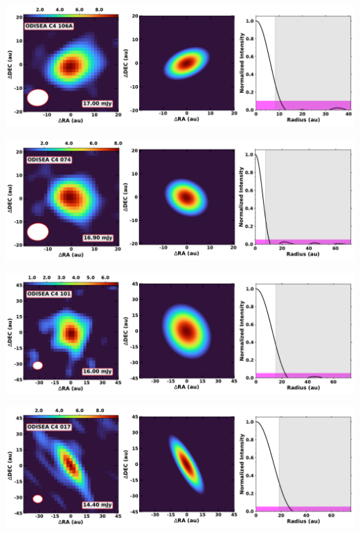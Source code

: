 \vspace{0pt}
\begin{minipage}{.49\textwidth}
	 \centering
	 	 \hrulesep
	 	 \includegraphics[width=1\linewidth]{pdf/0+II/018_odisea_c4_106a_cutout.pdf}
\end{minipage}%
\vrulesep
\begin{minipage}{.49\textwidth}
	 \centering
	 	 \hrulesep
	 	 \includegraphics[width=1\linewidth]{pdf/0+II/017_odisea_c4_074_cutout.pdf}
\end{minipage}%
\vspace{0pt}
\begin{minipage}{.49\textwidth}
	 \centering
	 	 \hrulesep
	 	 \includegraphics[width=1\linewidth]{pdf/0+II/016_odisea_c4_101_cutout.pdf}
\end{minipage}%
\vrulesep
\begin{minipage}{.49\textwidth}
	 \centering
	 	 \hrulesep
	 	 \includegraphics[width=1\linewidth]{pdf/0+II/013_odisea_c4_017_cutout.pdf}
\end{minipage}%
